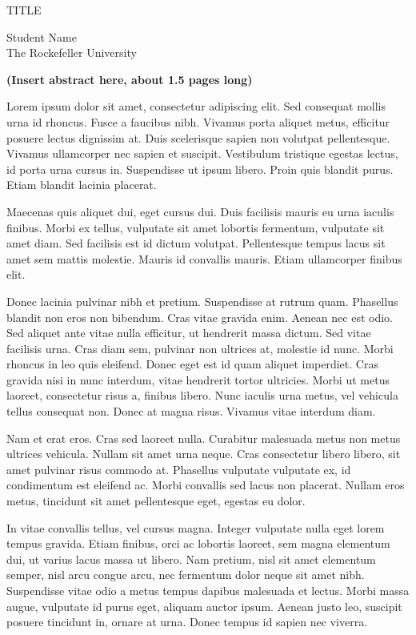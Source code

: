 \begin{center}
\thispagestyle{empty}

TITLE 

Student Name\\
The Rockefeller University \the\year
\end{center}
\begin{flushleft}
\hspace{10mm}
\textbf{(Insert abstract here, about 1.5 pages long)}

Lorem ipsum dolor sit amet, consectetur adipiscing elit. Sed consequat mollis urna id rhoncus. Fusce a faucibus nibh. Vivamus porta aliquet metus, efficitur posuere lectus dignissim at. Duis scelerisque sapien non volutpat pellentesque. Vivamus ullamcorper nec sapien et suscipit. Vestibulum tristique egestas lectus, id porta urna cursus in. Suspendisse ut ipsum libero. Proin quis blandit purus. Etiam blandit lacinia placerat.

Maecenas quis aliquet dui, eget cursus dui. Duis facilisis mauris eu urna iaculis finibus. Morbi ex tellus, vulputate sit amet lobortis fermentum, vulputate sit amet diam. Sed facilisis est id dictum volutpat. Pellentesque tempus lacus sit amet sem mattis molestie. Mauris id convallis mauris. Etiam ullamcorper finibus elit.

Donec lacinia pulvinar nibh et pretium. Suspendisse at rutrum quam. Phasellus blandit non eros non bibendum. Cras vitae gravida enim. Aenean nec est odio. Sed aliquet ante vitae nulla efficitur, ut hendrerit massa dictum. Sed vitae facilisis urna. Cras diam sem, pulvinar non ultrices at, molestie id nunc. Morbi rhoncus in leo quis eleifend. Donec eget est id quam aliquet imperdiet. Cras gravida nisi in nunc interdum, vitae hendrerit tortor ultricies. Morbi ut metus laoreet, consectetur risus a, finibus libero. Nunc iaculis urna metus, vel vehicula tellus consequat non. Donec at magna risus. Vivamus vitae interdum diam.

Nam et erat eros. Cras sed laoreet nulla. Curabitur malesuada metus non metus ultrices vehicula. Nullam sit amet urna neque. Cras consectetur libero libero, sit amet pulvinar risus commodo at. Phasellus vulputate vulputate ex, id condimentum est eleifend ac. Morbi convallis sed lacus non placerat. Nullam eros metus, tincidunt sit amet pellentesque eget, egestas eu dolor.

In vitae convallis tellus, vel cursus magna. Integer vulputate nulla eget lorem tempus gravida. Etiam finibus, orci ac lobortis laoreet, sem magna elementum dui, ut varius lacus massa ut libero. Nam pretium, nisl sit amet elementum semper, nisl arcu congue arcu, nec fermentum dolor neque sit amet nibh. Suspendisse vitae odio a metus tempus dapibus malesuada et lectus. Morbi massa augue, vulputate id purus eget, aliquam auctor ipsum. Aenean justo leo, suscipit posuere tincidunt in, ornare at urna. Donec tempus id sapien nec viverra.


\end{flushleft}
